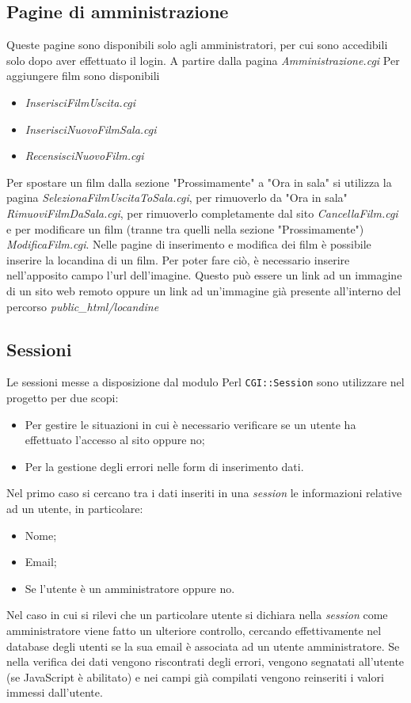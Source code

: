 \documentclass[../Relazione.tex]{subfiles}
\begin{document}
\subsection{Pagine di amministrazione}
Queste pagine sono disponibili solo agli amministratori, per cui sono accedibili solo dopo aver effettuato il login. A partire dalla pagina \textit{Amministrazione.cgi} Per aggiungere film sono disponibili
\begin{itemize}
\item \textit{InserisciFilmUscita.cgi}
\item \textit{InserisciNuovoFilmSala.cgi}
\item \textit{RecensisciNuovoFilm.cgi}
\end{itemize}
Per spostare un film dalla sezione "Prossimamente" a "Ora in sala" si utilizza la pagina \textit{SelezionaFilmUscitaToSala.cgi}, per rimuoverlo da "Ora in sala" \textit{RimuoviFilmDaSala.cgi}, per rimuoverlo completamente dal sito \textit{CancellaFilm.cgi} e per modificare un film (tranne tra quelli nella sezione "Prossimamente") \textit{ModificaFilm.cgi}. Nelle pagine di inserimento e modifica dei film è possibile inserire la locandina di un film. Per poter fare ciò, è necessario inserire nell'apposito campo l'url dell'imagine. Questo può essere un link ad un immagine di un sito web remoto oppure un link ad un'immagine già presente all'interno del percorso \textit{public\_html/locandine}

\subsection{Sessioni}
Le sessioni messe a disposizione dal modulo Perl \texttt{CGI::Session} sono utilizzare nel progetto per due scopi:
\begin{itemize}
	\item Per gestire le situazioni in cui è necessario verificare se un utente ha effettuato l'accesso al sito oppure no;
	\item Per la gestione degli errori nelle form di inserimento dati.
\end{itemize}
Nel primo caso si cercano tra i dati inseriti in una \textit{session} le informazioni relative ad un utente, in particolare:
\begin{itemize}
	\item Nome;
	\item Email;
	\item Se l'utente è un amministratore oppure no.
\end{itemize}
Nel caso in cui si rilevi che un particolare utente si dichiara nella \textit{session} come amministratore viene fatto un ulteriore controllo, cercando effettivamente nel database degli utenti se la sua email è associata ad un utente amministratore.
Se nella verifica dei dati vengono riscontrati degli errori, vengono segnatati all'utente (se JavaScript è abilitato) e nei campi già compilati vengono reinseriti i valori immessi dall'utente.
\end{document}

